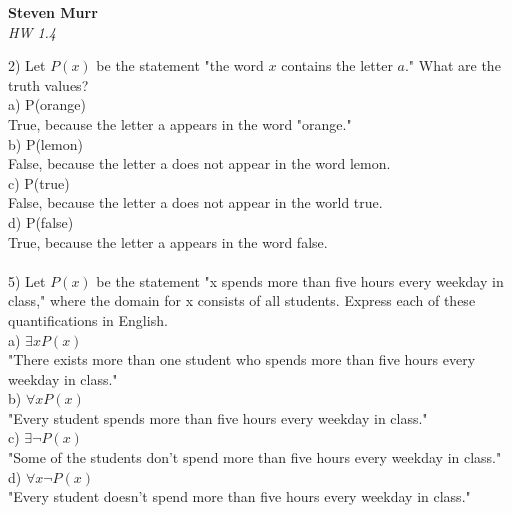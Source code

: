 \documentclass{article}
\begin{document}
\setcounter{totalnumber}{5}
   \begin{flushright}
      \Large\textbf{Steven Murr}\\
      \large\textit{HW 1.4}
   \end{flushright}
\begin{flushleft}
\makeatletter%
\setlength{\@fptop}{5pt}
\makeatother

2) Let $P(x)$ be the statement "the word $x$ contains the letter $a$."  What are the truth values? \\
\setlength\parindent{24pt}a) P(orange) \\
\setlength\parindent{48pt} True, because the letter a appears in the word "orange." \\
\setlength\parindent{24pt}b) P(lemon) \\
\setlength\parindent{48pt} False, because the letter a does not appear in the word lemon. \\
\setlength\parindent{24pt}c) P(true) \\
\setlength\parindent{48pt} False, because the letter a does not appear in the world true. \\
\setlength\parindent{24pt}d) P(false) \\
\setlength\parindent{48pt} True, because the letter a appears in the word false. \\~\\
\setlength\parindent{0pt}5) Let $P(x)$ be the statement "x spends more than five hours every weekday in class," where the domain for x consists of all students.  Express each of these quantifications in English.\\
\setlength\parindent{24pt}a) $\exists x P(x)$ \\
\setlength\parindent{48pt} "There exists more than one student who spends more than five hours every weekday in class." \\
\setlength\parindent{24pt}b) $\forall x P(x)$ \\
\setlength\parindent{48pt} "Every student spends more than five hours every weekday in class." \\
\setlength\parindent{24pt}c) $\exists \neg P(x)$ \\
\setlength\parindent{48pt} "Some of the students don't spend more than five hours every weekday in class."\\
\setlength\parindent{24pt}d) $\forall x \neg P(x)$ \\
\setlength\parindent{48pt} "Every student doesn't spend more than five hours every weekday in class."\\

\end{flushleft}
\end{document}
